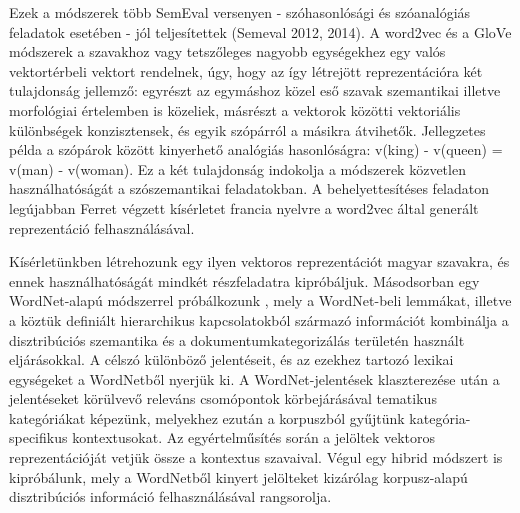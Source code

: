 \documentclass{llncs}
\begin{document}
Ezek a m\'{o}dszerek t\"{o}bb SemEval versenyen - sz\'{o}hasonl\'{o}s\'{a}gi \'{e}s sz\'{o}anal\'{o}gi\'{a}s feladatok eset\'{e}ben - j\'{o}l teljes\'{i}tettek (Semeval 2012, 2014). A word2vec \cite{mikolov13} \'{e}s a GloVe \cite{pennington14} m\'{o}dszerek a szavakhoz  vagy tetsz\H{o}leges nagyobb egys\'{e}gekhez egy val\'{o}s vektort\'{e}rbeli vektort rendelnek, \'{u}gy, hogy az \'{i}gy l\'{e}trej\"{o}tt reprezent\'{a}ci\'{o}ra k\'{e}t tulajdons\'{a}g jellemz\H{o}: egyr\'{e}szt az egym\'{a}shoz k\"{o}zel es\H{o} szavak szemantikai illetve morfol\'{o}giai \'{e}rtelemben is k\"{o}zeliek, m\'{a}sr\'{e}szt a vektorok k\"{o}z\"{o}tti vektori\'{a}lis k\"{u}l\"{o}nbs\'{e}gek konzisztensek, \'{e}s egyik sz\'{o}p\'{a}rr\'{o}l a m\'{a}sikra \'{a}tvihet\H{o}k. Jellegzetes p\'{e}lda a sz\'{o}p\'{a}rok k\"{o}z\"{o}tt kinyerhet\H{o} anal\'{o}gi\'{a}s hasonl\'{o}s\'{a}gra: v(king) - v(queen) = v(man) - v(woman). Ez a k\'{e}t tulajdons\'{a}g indokolja a m\'{o}dszerek k\"{o}zvetlen haszn\'{a}lhat\'{o}s\'{a}g\'{a}t a sz\'{o}szemantikai feladatokban. A behelyettes\'{i}t\'{e}ses feladaton leg\'{u}jabban Ferret \cite{ferret14} v\'{e}gzett k\'{i}s\'{e}rletet francia nyelvre a word2vec \'{a}ltal gener\'{a}lt reprezent\'{a}ci\'{o} felhaszn\'{a}l\'{a}s\'{a}val. 

K\'{i}s\'{e}rlet\"{u}nkben l\'{e}trehozunk egy ilyen vektoros reprezent\'{a}ci\'{o}t magyar szavakra, \'{e}s ennek haszn\'{a}lhat\'{o}s\'{a}g\'{a}t mindk\'{e}t r\'{e}szfeladatra kipr\'{o}b\'{a}ljuk. M\'{a}sodsorban egy WordNet-alap\'{u} m\'{o}dszerrel pr\'{o}b\'{a}lkozunk \cite{gabor14}, mely a WordNet-beli lemm\'{a}kat, illetve a k\"{o}zt\"{u}k defini\'{a}lt hierarchikus kapcsolatokb\'{o}l sz\'{a}rmaz\'{o} inform\'{a}ci\'{o}t kombin\'{a}lja a disztrib\'{u}ci\'{o}s szemantika \'{e}s a dokumentumkategoriz\'{a}l\'{a}s ter\"{u}let\'{e}n haszn\'{a}lt elj\'{a}r\'{a}sokkal. A c\'{e}lsz\'{o} k\"{u}l\"{o}nb\"{o}z\H{o} jelent\'{e}seit, \'{e}s az ezekhez tartoz\'{o} lexikai egys\'{e}geket a WordNetb\H{o}l nyerj\"{u}k ki. A WordNet-jelent\'{e}sek klaszterez\'{e}se ut\'{a}n a jelent\'{e}seket k\"{o}r\"{u}lvev\H{o} relev\'{a}ns csom\'{o}pontok k\"{o}rbej\'{a}r\'{a}s\'{a}val tematikus kateg\'{o}ri\'{a}kat k\'{e}pez\"{u}nk, melyekhez ezut\'{a}n a korpuszb\'{o}l gy\H{u}jt\"{u}nk kateg\'{o}ria-specifikus kontextusokat. Az egy\'{e}rtelm\H{u}s\'{i}t\'{e}s sor\'{a}n a jel\"{o}ltek vektoros reprezent\'{a}ci\'{o}j\'{a}t vetj\"{u}k \"{o}ssze a kontextus szavaival. V\'{e}gul egy hibrid m\'{o}dszert is kipr\'{o}b\'{a}lunk, mely a WordNetb\H{o}l kinyert jel\"{o}lteket kiz\'{a}r\'{o}lag korpusz-alap\'{u} disztrib\'{u}ci\'{o}s inform\'{a}ci\'{o} felhaszn\'{a}l\'{a}s\'{a}val rangsorolja.
\end{document}
